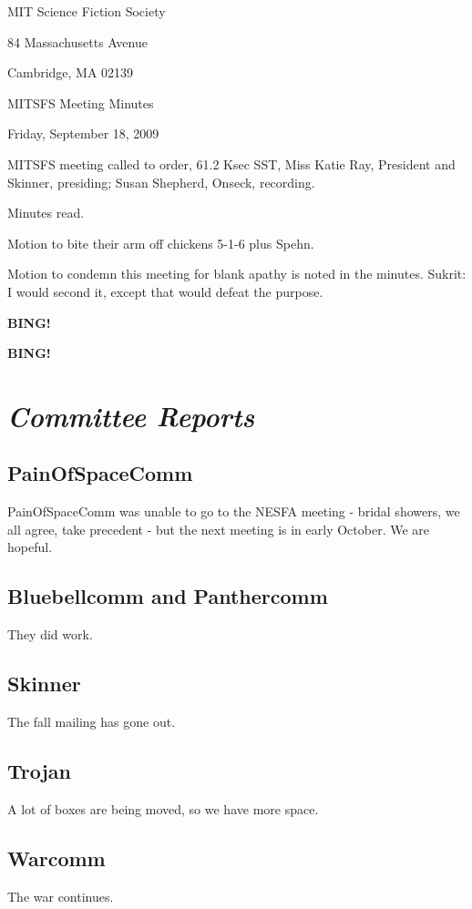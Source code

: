 \documentclass[10pt]{article}
\newcommand{\bing}{{\bf BING!} }
\newcommand{\goto}[1]{\bing \vskip 12pt \section*{{\em{#1}}}}
\newcommand{\ps}{ plus Spehn\xspace}
\begin{document}
\begin{center}

MIT Science Fiction Society

84 Massachusetts Avenue

Cambridge, MA 02139

\vspace{12pt}

MITSFS Meeting Minutes

Friday, September 18, 2009

\end{center}

\vspace{18pt}

\setlength{\parskip}{6pt}

\noindent
MITSFS meeting called to order, 61.2 Ksec SST,
Miss Katie Ray, President and Skinner, presiding; Susan Shepherd, Onseck, recording.

Minutes read.

Motion to bite their arm off chickens 5-1-6\ps.

Motion to condemn this meeting for blank apathy is noted in the minutes.
Sukrit: I would second it, except that would defeat the purpose.

\bing

\goto{Committee Reports}

\subsection*{PainOfSpaceComm}
PainOfSpaceComm was unable to go to the NESFA meeting - bridal showers, we all agree, take precedent - but the next meeting is in early October. We are hopeful.

\subsection*{Bluebellcomm and Panthercomm}
They did work.

\subsection*{Skinner}
The fall mailing has gone out.

\subsection*{Trojan}
A lot of boxes are being moved, so we have more space.

\subsection*{Warcomm}
The war continues.
\end{document}
